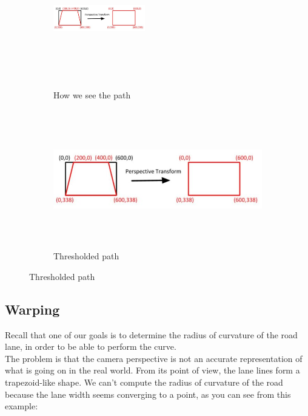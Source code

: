 \documentclass[12pt,a4paper]{article}
\begin{document}
\begin{large}
\begin{figure} [!htb]
  \centering
    \begin{subfigure}[b]{0.4\textwidth}
    \centering
    \captionsetup{justification=centering}
      \includegraphics[width=4cm, height = 6cm]{images/perspective_transform.jpg}
      \caption{How we see the path}
      
    \end{subfigure}
    \hspace{1cm}
    \begin{subfigure}[b]{0.4\textwidth}
    \centering
    \captionsetup{justification=centering}
      \includegraphics[width=\textwidth, height = 6cm]{images/perspective_transform.jpg}
      \caption{Thresholded path \\}
      
    \end{subfigure}
  \end{figure}

\subsection{Warping}
Recall that one of our goals is to determine the radius of curvature of the road lane, in order to be able to perform the curve. \\
The problem is that the camera perspective is not an accurate representation of what is going on in the real world. From its point of view, the lane lines form a trapezoid-like shape. We can't compute the radius of curvature of the road because the lane width seems converging to a point, as you can see from this example:\\


\end{large}
\end{document}
